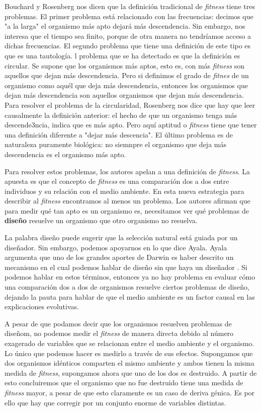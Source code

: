 Bouchard y Rosenberg \cite{Bouchard2004} nos dicen que la definición tradicional de \emph{fitness} tiene tres problemas. El primer problema está relacionado con las frecuencias: decimos que "a la larga" el organismo más apto dejará más descendencia. Sin embargo, nos interesa que el tiempo sea finito, porque de otra manera no tendríamos acceso a dichas frecuencias. El segundo problema que tiene una definición de este tipo es que es una tautología. l problema que se ha detectado es que la definición es circular. Se supone que los organismos más aptos, esto es, con más \emph{fitness} son aquellos que dejan más descendencia. Pero si definimos el grado de \emph{fitnes} de un organismo como aquél que deja más descendencia, entonces los organismos que dejan más descendencia son aquellos organismos que dejan más descendencia. Para resolver el problema de la circularidad, Rosenberg nos dice que hay que leer causalmente la definición anterior: el hecho de que un organismo tenga más descende3ncia, indica que es más apto. Pero aquí aptitud o \emph{fitness} tiene que tener una definición diferente a "dejar más descencia". El último problema es de naturaleza puramente biológica: no siemnpre el organismo que deja más descendencia es el organismo más apto.

Para resolver estos problemas, los autores apelan a una definición de \emph{fitness}. La apuesta es que el concepto de \emph{fitness} es una comparación dos a dos entre individuos y su relación con el medio ambiente. En esta nueva estrategia para describir al \emph{fitness} encontramos al menos un problema. Los autores afirman que para medir qué tan apto es un organismo es, necesitamos ver qué problemas de \textbf{diseño} resuelve un organismo que otro organismo no resuelva.

La palabra diseño puede sugerir que la selección natural está guiada por un diseñador. Sin embargo, podemos apoyarnos en lo que dice Ayala. Ayala argumenta que uno de los grandes aportes de Darwin es haber descrito un mecanismo en el cual podemos hablar de diseño sin que haya un diseñador \cite{Ayala2004}. Si podemos hablar en estos términos, entonces ya no hay problema en evaluar cómo una comparación dos a dos de organismos resuelve ciertos problemas de diseño, dejando la pauta para hablar de que el medio ambiente es un factor causal en las explicaciones evolutivas.

A pesar de que podamos decir que los organismos resuelven problemas de diseñom, no podemos medir el \emph{fitness} de manera directa debido al número exagerado de variables que se relacionan entre el medio ambiente y el organismo. Lo único que podemos hacer es medirlo a través de sus efectos. Supongamos que dos organismos idénticos comparten el mismo ambiente y ambos tienen la misma medida de \emph{fitness}, supongamos ahora que uno de los dos es destruido. A partir de esto concluiremos que el organismo que no fue destruido tiene una medida de \emph{fitness} mayor, a pesar de que esto claramente es un caso de deriva génica. Es por ello que hay que corregir por un conjunto enorme de variables distintas.

